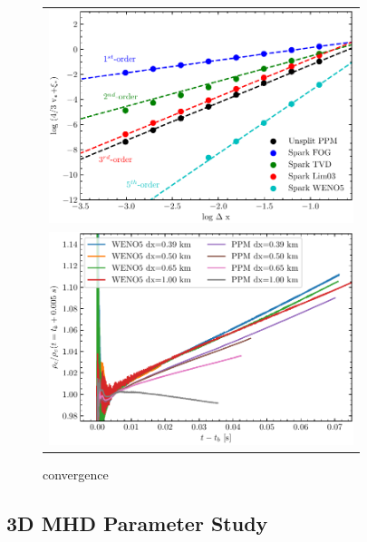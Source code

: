 \begin{figure}
  \begin{tabular}{c}
    \includegraphics[width=3.5in]{figs/convergence}\\
    \includegraphics[width=3.5in]{figs/centralDens}
  \end{tabular}
  \caption{convergence}
  \label{fig:converge}
\end{figure}



\subsection{3D MHD Parameter Study}
\label{sec:ParamStudy}

